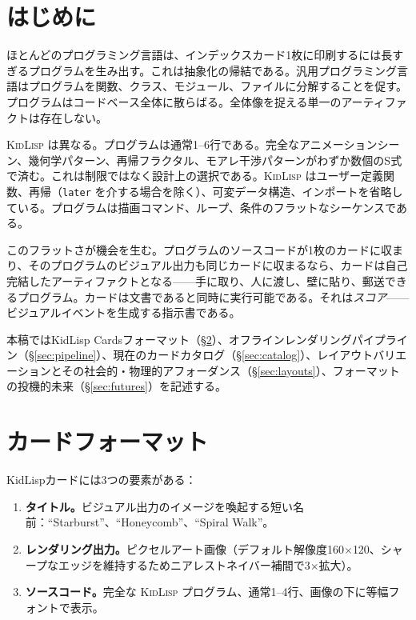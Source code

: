 \documentclass[10pt,letterpaper,twocolumn]{article}
\newcommand{\kidlisp}{\textsc{KidLisp}}
\begin{document}

\section{はじめに}

ほとんどのプログラミング言語は、インデックスカード1枚に印刷するには長すぎるプログラムを生み出す。これは抽象化の帰結である。汎用プログラミング言語はプログラムを関数、クラス、モジュール、ファイルに分解することを促す。プログラムはコードベース全体に散らばる。全体像を捉える単一のアーティファクトは存在しない。

\kidlisp{} は異なる。プログラムは通常1--6行である。完全なアニメーションシーン、幾何学パターン、再帰フラクタル、モアレ干渉パターンがわずか数個のS式で済む。これは制限ではなく設計上の選択である。\kidlisp{} はユーザー定義関数、再帰（\texttt{later} を介する場合を除く）、可変データ構造、インポートを省略している。プログラムは描画コマンド、ループ、条件のフラットなシーケンスである。

このフラットさが機会を生む。プログラムのソースコードが1枚のカードに収まり、そのプログラムのビジュアル出力も同じカードに収まるなら、カードは自己完結したアーティファクトとなる——手に取り、人に渡し、壁に貼り、郵送できるプログラム。カードは文書であると同時に実行可能である。それは\emph{スコア}——ビジュアルイベントを生成する指示書である。

本稿ではKidLisp Cardsフォーマット（\S\ref{sec:format}）、オフラインレンダリングパイプライン（\S\ref{sec:pipeline}）、現在のカードカタログ（\S\ref{sec:catalog}）、レイアウトバリエーションとその社会的・物理的アフォーダンス（\S\ref{sec:layouts}）、フォーマットの投機的未来（\S\ref{sec:futures}）を記述する。


\section{カードフォーマット}
\label{sec:format}

KidLispカードには3つの要素がある：

\begin{enumerate}
  \item \textbf{タイトル。}ビジュアル出力のイメージを喚起する短い名前：``Starburst''、``Honeycomb''、``Spiral Walk''。
  \item \textbf{レンダリング出力。}ピクセルアート画像（デフォルト解像度160$\times$120、シャープなエッジを維持するためニアレストネイバー補間で3$\times$拡大）。
  \item \textbf{ソースコード。}完全な \kidlisp{} プログラム、通常1--4行、画像の下に等幅フォントで表示。
\end{enumerate}
\end{document}
